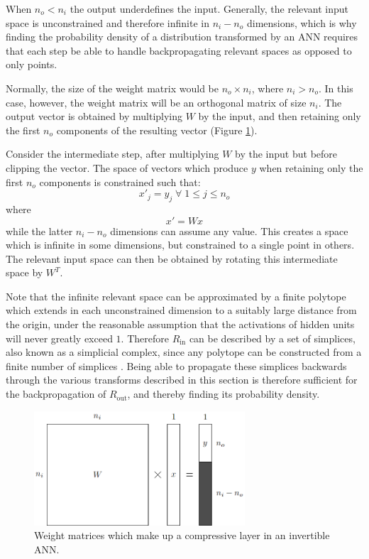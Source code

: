 \documentclass[../../main.tex]{subfiles}
\begin{document}
When $n_o<n_i$ the output underdefines the input.
Generally, the relevant input space is unconstrained and therefore infinite in $n_i-n_o$ dimensions, which is why finding the probability density of a distribution transformed by an ANN requires that each step be able to handle backpropagating relevant spaces as opposed to only points.

Normally, the size of the weight matrix would be $n_o\times n_i$, where $n_i>n_o$.
In this case, however, the weight matrix will be an orthogonal matrix of size $n_i$.
The output vector is obtained by multiplying $W$ by the input, and then retaining only the first $n_o$ components of the resulting vector (Figure \ref{fig:compressiveLayer}).

Consider the intermediate step, after multiplying $W$ by the input but before clipping the vector.
The space of vectors which produce $y$ when retaining only the first $n_o$ components is constrained such that:
\begin{equation}
    x'_j=y_j\;\forall\;1\le j\le n_o
\end{equation}
where
\begin{equation}
    x'=Wx
\end{equation}
while the latter $n_i-n_o$ dimensions can assume any value.
This creates a space which is infinite in some dimensions, but constrained to a single point in others.
The relevant input space can then be obtained by rotating this intermediate space by $W^T$.

Note that the infinite relevant space can be approximated by a finite polytope which extends in each unconstrained dimension to a suitably large distance from the origin, under the reasonable assumption that the activations of hidden units will never greatly exceed $1$.
Therefore $R_\text{in}$ can be described by a set of simplices, also known as a simplicial complex, since any polytope can be constructed from a finite number of simplices \cite{wildberger12}.
Being able to propagate these simplices backwards through the various transforms described in this section is therefore sufficient for the backpropagation of $R_\text{out}$, and thereby finding its probability density.
\begin{figure}[H]
    \begin{center}
    \includegraphics[width=0.7\textwidth]{compressiveLayer}
    \caption{
        Weight matrices which make up a compressive layer in an invertible ANN.
    }
    \label{fig:compressiveLayer}
    \end{center}
\end{figure}
\end{document}
